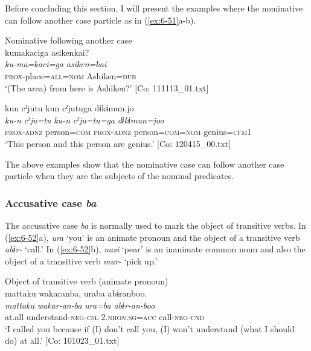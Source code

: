   Before concluding this section, I will present the examples where the nominative can follow another case particle as in (\ref{ex:6-51}a-b).

\ea\label{ex:6-51}
 Nominative following another case\\

 \ea
 {\TM}
\glll  kumakaciga  asikenkai?\\
\textit{ku-ma=kaci=ga}  \textit{asiken=kai}\\
\textsc{prox}-place=\textsc{all}=\textsc{nom}  Ashiken=\textsc{dub}\\
\glt ‘(The area) from here is Ashiken?’ [Co: 111113\_01.txt]

\ex
{\TM}
\glll kun  cˀjutu  kun  cˀjutuga  dɨkɨmun.jo.\\
\textit{ku-n}  \textit{cˀju=tu}  \textit{ku-n}  \textit{cˀju=tu=ga} \textit{dɨkɨmun=joo}\\
\textsc{prox}-\textsc{adnz}  person=\textsc{com}  \textsc{prox}-\textsc{adnz}  person=\textsc{com}=\textsc{nom}   genius=\textsc{cfm}1\\

\glt ‘This person and this person are genius.’ [Co: 120415\_00.txt]
\z
\z

The above examples show that the nominative case can follow another case particle when they are the subjects of the nominal predicates.

\subsubsection{Accusative case \textit{ba}}

The accusative case \textit{ba} is normally used to mark the object of transitive verbs. In (\ref{ex:6-52}a), \textit{ura} ‘you’ is an animate pronoun and the object of a transitive verb \textit{abɨr-} ‘call.’ In (\ref{ex:6-52}b), \textit{nasi} ‘pear’ is an inanimate common noun and also the object of a transitive verb \textit{mur-} ‘pick up.’

\ea\label{ex:6-52}
\ea Object of transitive verb (animate pronoun)\\
{\TM}
\glll  mattaku  wakaranba,  uraba  abɨranboo.\\
\textit{mattaku}  \textit{wakar-an-ba}  \textit{ura=ba}  \textit{abɨr-an-boo}\\
at.all  understand-\textsc{neg}-\textsc{csl}  2.\textsc{nhon}.\textsc{sg}=\textsc{acc}  call-\textsc{neg}-\textsc{cnd}\\
\glt ‘I called you because if (I) don’t call you, (I) won’t understand (what I should do) at all.’ [Co: 101023\_01.txt]

